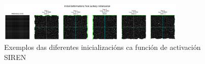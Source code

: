 \begin{figure}[ht]
    \centering
    \includegraphics[width=0.8\textwidth]{imaxes/lottery/initial_deformations_combinedSIREN.png}
    \caption{Exemplos das diferentes inicializacións ca función de activación SIREN}
    \label{fig:lottery_initial_deformations_combinedSIREN}
\end{figure}

